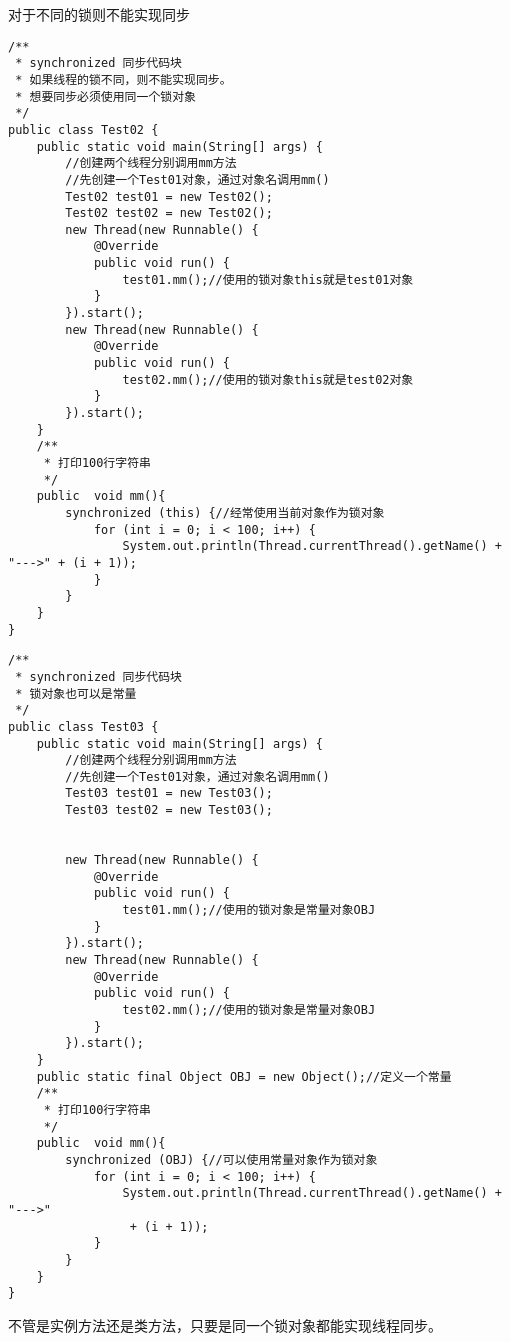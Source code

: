 \documentclass[a4paper]{report}
\begin{document}
对于不同的锁则不能实现同步
\begin{lstlisting}
/**
 * synchronized 同步代码块
 * 如果线程的锁不同，则不能实现同步。
 * 想要同步必须使用同一个锁对象
 */
public class Test02 {
    public static void main(String[] args) {
        //创建两个线程分别调用mm方法
        //先创建一个Test01对象，通过对象名调用mm()
        Test02 test01 = new Test02();
        Test02 test02 = new Test02();
        new Thread(new Runnable() {
            @Override
            public void run() {
                test01.mm();//使用的锁对象this就是test01对象
            }
        }).start();
        new Thread(new Runnable() {
            @Override
            public void run() {
                test02.mm();//使用的锁对象this就是test02对象
            }
        }).start();
    }
    /**
     * 打印100行字符串
     */
    public  void mm(){
        synchronized (this) {//经常使用当前对象作为锁对象
            for (int i = 0; i < 100; i++) {
                System.out.println(Thread.currentThread().getName() + "--->" + (i + 1));
            }
        }
    }
}
\end{lstlisting}
\begin{Verbatim}[frame=single,numbersep=5pt,xleftmargin=1.5em,xrightmargin=1.5em]
/**
 * synchronized 同步代码块
 * 锁对象也可以是常量
 */
public class Test03 {
    public static void main(String[] args) {
        //创建两个线程分别调用mm方法
        //先创建一个Test01对象，通过对象名调用mm()
        Test03 test01 = new Test03();
        Test03 test02 = new Test03();


        new Thread(new Runnable() {
            @Override
            public void run() {
                test01.mm();//使用的锁对象是常量对象OBJ
            }
        }).start();
        new Thread(new Runnable() {
            @Override
            public void run() {
                test02.mm();//使用的锁对象是常量对象OBJ
            }
        }).start();
    }
    public static final Object OBJ = new Object();//定义一个常量
    /**
     * 打印100行字符串
     */
    public  void mm(){
        synchronized (OBJ) {//可以使用常量对象作为锁对象
            for (int i = 0; i < 100; i++) {
                System.out.println(Thread.currentThread().getName() + "--->"
                 + (i + 1));
            }
        }
    }
}
\end{Verbatim}

不管是实例方法还是类方法，只要是同一个锁对象都能实现线程同步。
\end{document}
